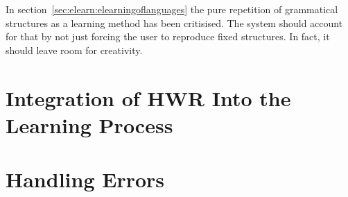 In section~\ref{sec:elearn:elearningoflanguages} the pure repetition of 
grammatical structures as a learning method has been critisised.
The system should account for that by not just forcing the user to
reproduce fixed structures. In fact, it should leave room for creativity.


\section{Integration of HWR Into the Learning Process}
\label{sec:concept:integrationofhwrintolearning}









\section{Handling Errors}
\label{sec:concept:handlingerrors}



